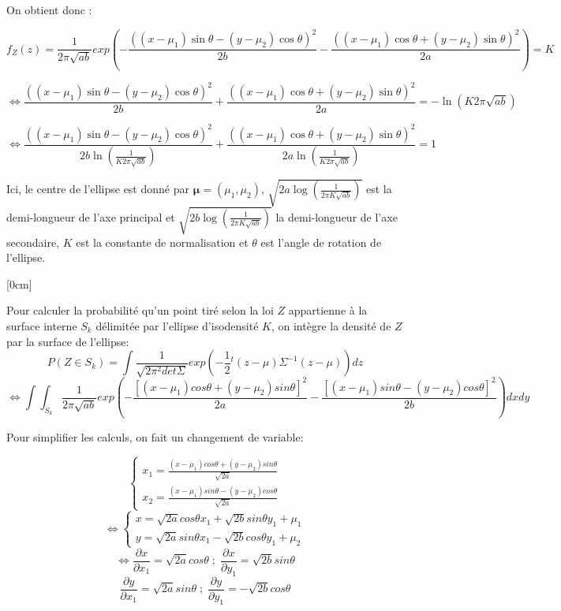 \documentclass{article}
\begin{document}
On obtient donc :

$$ f_Z(z) = \frac{1}{2\pi \sqrt{ab}}exp(-\frac{((x-\mu_1)\sin\theta-(y-\mu_2)\cos\theta)^{2}}{2b}-\frac{((x-\mu_1)\cos\theta+(y-\mu_2)\sin\theta)^{2}}{2a})=K$$

$$\Leftrightarrow   \frac{((x-\mu_1)\sin\theta-(y-\mu_2)\cos\theta)^{2}}{2b}+\frac{((x-\mu_1)\cos\theta+(y-\mu_2)\sin\theta)^{2}}{2a}=-\ln(K2\pi\sqrt{ab})$$

$$\Leftrightarrow   \frac{((x-\mu_1)\sin\theta-(y-\mu_2)\cos\theta)^{2}}{2b\ln(\frac{1}{K2\pi\sqrt{ab}})}+\frac{((x-\mu_1)\cos\theta+(y-\mu_2)\sin\theta)^{2}}{2a\ln(\frac{1}{K2\pi\sqrt{ab}})}=1$$

Ici, le centre de l'ellipse est donné par $\mathbf{\mu} = (\mu_1, \mu_2)$, $\sqrt{2a \log(\frac{1}{2\pi K \sqrt{ab}})}$ est la demi-longueur de l'axe principal et $\sqrt{2b \log(\frac{1}{2\pi K \sqrt{ab}})}$ la demi-longueur de l'axe secondaire, $K$ est la constante de normalisation et $\theta$ est l'angle de rotation de l'ellipse.

\reversemarginpar{}[0cm]

Pour calculer la probabilité qu'un point tiré selon la loi $Z$ appartienne à la surface interne $S_k$ délimitée par l'ellipse d'isodensité $K$, on intègre la densité de $Z$ par la surface de l'ellipse:
$$P(Z \in S_k) = \int \frac{1}{\sqrt{2\pi^2det\Sigma}}exp(-\frac{1}{2} {}^{t}(z-\mu)\Sigma^{-1}(z-\mu)) dz$$
$$\Leftrightarrow \int\int_{S_k}^{} \frac{1}{2\pi\sqrt{ab}}exp(-\frac{[(x-\mu_1)cos\theta+(y-\mu_2)sin\theta]^2}{2a}-\frac{[(x-\mu_1)sin\theta-(y-\mu_2)cos\theta]^2}{2b})dxdy$$

Pour simplifier les calculs, on fait un changement de variable:

$$\left\{\begin{matrix}x_1=\frac{(x-\mu_1)cos\theta+(y-\mu_2)sin\theta}{\sqrt{2a}}
    \\ x_2=\frac{(x-\mu_1)sin\theta-(y-\mu_2)cos\theta}{\sqrt{2a}}
    \end{matrix}\right.$$
$$\Leftrightarrow 
\left\{\begin{matrix}x=\sqrt{2a}cos\theta x_1+\sqrt{2b}sin\theta y_1 +\mu_1
\\ y=\sqrt{2a}sin\theta x_1-\sqrt{2b}cos\theta y_1 +\mu_2
\end{matrix}\right.$$
$$\Leftrightarrow 
\frac{\partial x}{\partial x_1}=\sqrt{2a}cos\theta\; ;\; \frac{\partial x}{\partial y_1}=\sqrt{2b}sin\theta$$
$$
\frac{\partial y}{\partial x_1}=\sqrt{2a}sin\theta\; ;\; \frac{\partial y}{\partial y_1}=-\sqrt{2b}cos\theta$$
\end{document}
